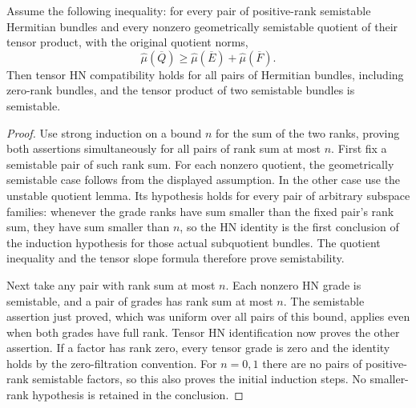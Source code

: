 \begin{proposition}
\label{prop:conditional-tensor-hn-assembly}
\leanok
Assume the following inequality: for every pair of positive-rank
semistable Hermitian bundles and every nonzero geometrically semistable
quotient of their tensor product, with the original quotient norms,
\[
 \widehat\mu(\overline Q)\ge
 \widehat\mu(\overline E)+\widehat\mu(\overline F).
\]
Then tensor HN compatibility holds for all pairs of Hermitian bundles,
including zero-rank bundles, and the tensor product of two semistable
bundles is semistable.
\end{proposition}
\begin{proof}
Use strong induction on a bound $n$ for the sum of the two ranks,
proving both assertions simultaneously for all pairs of rank sum at most $n$.
First fix a semistable pair of such rank sum. For each nonzero quotient,
the geometrically semistable case follows from the displayed assumption.
In the other case use the unstable quotient lemma. Its hypothesis holds
for every pair of arbitrary subspace families: whenever the grade ranks
have sum smaller than the fixed pair's rank sum, they have sum smaller
than $n$, so the HN identity is the first conclusion of the induction
hypothesis for those actual subquotient bundles. The quotient inequality
and the tensor slope formula therefore prove semistability.

Next take any pair with rank sum at most $n$. Each nonzero HN grade is
semistable, and a pair of grades has rank sum at most $n$. The semistable
assertion just proved, which was uniform over all pairs of this bound,
applies even when both grades have full rank. Tensor HN identification
now proves the other assertion. If a factor has rank zero, every tensor
grade is zero and the identity holds by the zero-filtration convention.
For $n=0,1$ there are no pairs of positive-rank semistable factors, so
this also proves the initial induction steps. No smaller-rank hypothesis
is retained in the conclusion.
\end{proof}

